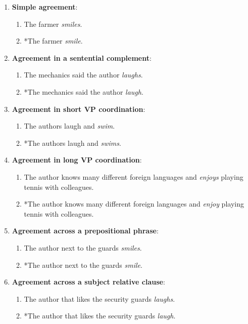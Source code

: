 \begin{enumerate}[noitemsep]
  \item \textbf{Simple agreement}:
    \begin{enumerate}
      \item The farmer \textit{smiles}.
      \item *The farmer \textit{smile}.
    \end{enumerate}
  \item \textbf{Agreement in a sentential complement}:
    \begin{enumerate}
      \item The mechanics said the author \textit{laughs}.
      \item *The mechanics said the author \textit{laugh}.
    \end{enumerate}
  \item \textbf{Agreement in short VP coordination}:
    \begin{enumerate}
      \item The authors laugh and \textit{swim}.
      \item *The authors laugh and \textit{swims}.
    \end{enumerate}
  \item \textbf{Agreement in long VP coordination}:
    \begin{enumerate}
      \item The author knows many different foreign languages and \textit{enjoys} playing tennis with colleagues.
      \item *The author knows many different foreign languages and \textit{enjoy} playing tennis with colleagues.
    \end{enumerate}
  \item \textbf{Agreement across a prepositional phrase}:
    \begin{enumerate}
      \item The author next to the guards \textit{smiles}.
      \item *The author next to the guards \textit{smile}.
    \end{enumerate}
  \item \textbf{Agreement across a subject relative clause}:
    \begin{enumerate}
      \item The author that likes the security guards \textit{laughs}.
      \item *The author that likes the security guards \textit{laugh}.
    \end{enumerate}

\end{enumerate}
